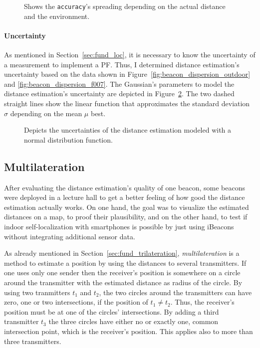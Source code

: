 \begin{figure}
	
	\caption {Shows the \texttt{accuracy}'s spreading depending on the actual distance and the environment.}
	\label{fig:beacon_dispersion}
\end{figure}


\paragraph{Uncertainty} As mentioned in Section~\ref{sec:fund_loc}, it is necessary to know the uncertainty of a measurement to implement a \acl{PF}. Thus, I determined distance estimation's uncertainty based on the data shown in Figure~\ref{fig:beacon_dispersion_outdoor} and \ref{fig:beacon_dispersion_f007}. The Gaussian's parameters to model the distance estimation's uncertainty are depicted in Figure~\ref{fig:beacon_eval_ndf}. The two dashed straight lines show the linear function that approximates the standard deviation $\sigma$ depending on the mean $\mu$ best.

\begin{figure}
	
	\caption{Depicts the uncertainties of the distance estimation modeled with a normal distribution function.}
	\label{fig:beacon_eval_ndf}
\end{figure}


\subsection{Multilateration}
After evaluating the distance estimation's quality of one beacon, some beacons were deployed in a lecture hall to get a better feeling of how good the distance estimation actually works. On one hand, the goal was to visualize the estimated distances on a map, to proof their plausibility, and on the other hand, to test if indoor self-localization with smartphones is possible by just using iBeacons without integrating additional sensor data.

As already mentioned in Section~\ref{sec:fund_trilateration}, \emph{multilateration} is a method to estimate a position by using the distances to several transmitters. If one uses only one sender then the receiver's position is somewhere on a circle around the transmitter with the estimated distance as radius of the circle.
By using two tranmitters $t_1$ and $t_2$, the two circles around the transmitters can have zero, one or two intersections, if the position of $t_1 \neq t_2$. Thus, the receiver's position must be at one of the circles' intersections.
By adding a third transmitter $t_3$ the three circles have either no or exactly one, common intersection point, which is the receiver's position. This applies also to more than three transmitters.

